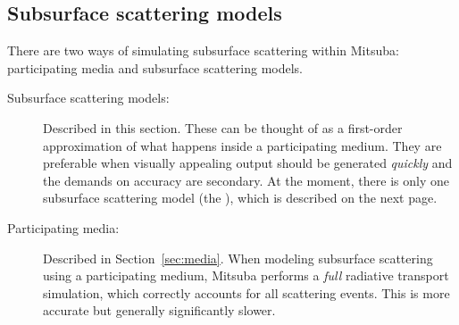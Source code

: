 \newpage
\subsection{Subsurface scattering models}
\label{sec:subsurface}
There are two ways of simulating subsurface scattering within Mitsuba:
participating media and subsurface scattering models.

\begin{description}
  \item[Subsurface scattering models:] Described in this section. These can be thought
    of as a first-order approximation of what happens inside a participating medium.
    They are preferable when visually appealing output should be generated
    \emph{quickly} and the demands on accuracy are secondary.
    At the moment, there is only one subsurface scattering model (the
    ), which is described on the next page.
  \item[Participating media:] Described in Section~\ref{sec:media}. When modeling
    subsurface scattering using a participating medium, Mitsuba performs a \emph{full}
    radiative transport simulation, which correctly accounts for all scattering events.
    This is more accurate but generally significantly slower.
\end{description}

